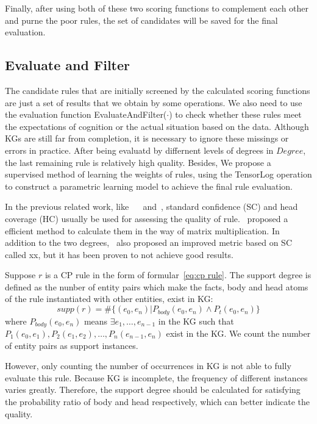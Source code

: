 \documentclass{article}
\begin{document}
	Finally, after using both of these two scoring functions to complement each other and purne the poor rules, the set of candidates will be saved for the final evaluation.
	

	
	
	\subsection{Evaluate and Filter}
	The candidate rules that are initially screened by the calculated scoring functions are just a set of results that we obtain by some operations. We also need to use the evaluation function \textsf{EvaluateAndFilter($\cdot$) }to check whether these rules meet the expectations of cognition or the actual situation based on the data. Although KGs are still far from completion, it is necessary to ignore these missings or errors in practice. After being evaluatd by differnent levels of degrees in $Degree$, the last remaining rule is relatively high quality.
	Besides, We propose a supervised method of learning the weights of rules, using the TensorLog operation to construct a parametric learning model to achieve the final rule evaluation.

	In the previous related work, like~\cite{Chen:ScaLeKB} ~\cite{Galarraga:AMIE+} and~\cite{Omran:RLvLR}, standard confidence (SC) and head coverage (HC) usually be used for assessing the quality of rule.~\cite{Omran:RLvLR} proposed a efficient method to calculate them in the way of matrix multiplication.
	In addition to the two degrees,~\cite{Galarraga:AMIE+} also proposed an improved metric based on SC called xx, but it has been proven to not achieve good results.
	
	Suppose $r$ is a CP rule in the form of formular~\ref{eq:cp rule}. The support degree is defined as the nunber of entity pairs which make the  facts, body and head atoms of the rule instantiated with other entities, exist in KG:
	\begin{equation}
		supp(r) = \#\{(e_0, e_n) | P_{body}(e_0, e_n) \land P_t(e_0, e_n)\} \nonumber
	\end{equation}
	where $P_{body}(e_0, e_n)$ means $\exists e_1, \dots, e_{n-1}$ in the KG such that $P_1(e_0, e_1), P_2(e_1, e_2), \dots, P_n(e_{n-1}, e_n)$ exist in the KG. We count the number of entity pairs as support instances.
	
	However, only counting the number of occurrences in KG is not able to fully evaluate this rule. Because KG is incomplete, the frequency of different instances varies greatly. Therefore, the support degree should be calculated for satisfying the probability ratio of body and head respectively, which can better indicate the quality.
	
\end{document}

